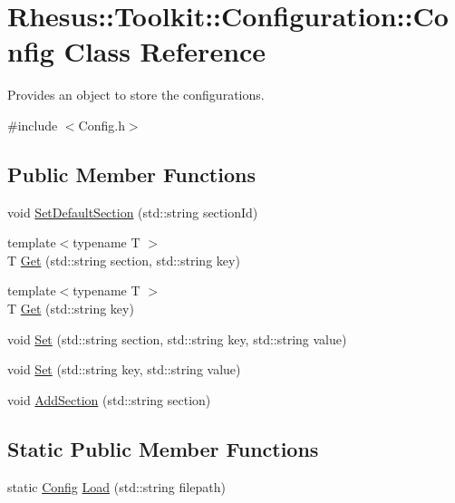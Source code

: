 \hypertarget{class_rhesus_1_1_toolkit_1_1_configuration_1_1_config}{\section{Rhesus\-:\-:Toolkit\-:\-:Configuration\-:\-:Config Class Reference}
\label{class_rhesus_1_1_toolkit_1_1_configuration_1_1_config}
}


Provides an object to store the configurations.  




{\ttfamily \#include $<$Config.\-h$>$}

\subsection*{Public Member Functions}
\begin{DoxyCompactItemize}
\item 
void \hyperlink{class_rhesus_1_1_toolkit_1_1_configuration_1_1_config_abefda47335dcfaf206962ee890de1417}{Set\-Default\-Section} (std\-::string section\-Id)
\item 
{\footnotesize template$<$typename T $>$ }\\T \hyperlink{class_rhesus_1_1_toolkit_1_1_configuration_1_1_config_ac8fd1917eb33485424cca7b0ee15ad8e}{Get} (std\-::string section, std\-::string key)
\item 
{\footnotesize template$<$typename T $>$ }\\T \hyperlink{class_rhesus_1_1_toolkit_1_1_configuration_1_1_config_aab340cc071bc9b49b134817088db22ef}{Get} (std\-::string key)
\item 
void \hyperlink{class_rhesus_1_1_toolkit_1_1_configuration_1_1_config_adf55fe527f6471348815fb69cd3826cd}{Set} (std\-::string section, std\-::string key, std\-::string value)
\item 
void \hyperlink{class_rhesus_1_1_toolkit_1_1_configuration_1_1_config_a3329c640c11339cae70a6415942fa0e1}{Set} (std\-::string key, std\-::string value)
\item 
void \hyperlink{class_rhesus_1_1_toolkit_1_1_configuration_1_1_config_a49a38f92490c971c37a9c7b3c59e65ef}{Add\-Section} (std\-::string section)
\end{DoxyCompactItemize}
\subsection*{Static Public Member Functions}
\begin{DoxyCompactItemize}
\item 
static \hyperlink{class_rhesus_1_1_toolkit_1_1_configuration_1_1_config}{Config} \hyperlink{class_rhesus_1_1_toolkit_1_1_configuration_1_1_config_ab8e66480e275823a1fdbc2924fe95855}{Load} (std\-::string filepath)
\end{DoxyCompactItemize}


